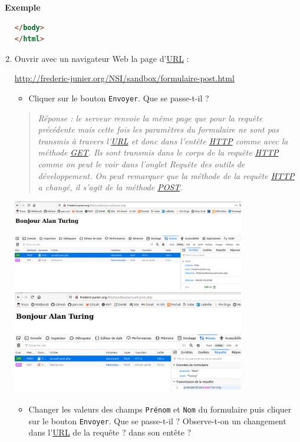 \documentclass[
  11pt,
]{article}
\newcommand{\passthrough}[1]{#1}
\providecommand{\tightlist}{%
  \setlength{\itemsep}{0pt}\setlength{\parskip}{0pt}}
\newcounter{rque}
\newcounter{exple}
\newenvironment{exemple}[1]
{\par \medskip   \addtocounter{exple}{1} \noindent  
\begin{bclogo}[arrondi =0.1,   noborder = true, logo=\bclampe, marge=4]{~\textbf{Exemple} \textbf{\theexple} {\itshape #1} }  \par}
{
\end{bclogo}
 \par \bigskip }
\begin{document}
\begin{exemple}{}
\begin{enumerate}
\begin{lstlisting}[language=HTML]
</body>
</html> 
\end{lstlisting}
\item
  Ouvrir avec un navigateur Web la page
  d'\href{https://developer.mozilla.org/fr/docs/Glossaire/URL}{URL} :

  \url{http://frederic-junier.org/NSI/sandbox/formulaire-post.html}

  \begin{itemize}
  \tightlist
  \item
    Cliquer sur le bouton \passthrough{\lstinline!Envoyer!}. Que se
    passe-t-il ?
  \end{itemize}

  \begin{quote}
  \emph{Réponse : le serveur renvoie la même page que pour la requête
  précédente mais cette fois les paramètres du formulaire ne sont pas
  transmis à travers l'\url{URL} et donc dans l'entête \url{HTTP} comme
  avec la méthode \url{GET}. Ils sont transmis dans le corps de la
  requête \url{HTTP} comme on peut le voir dans l'onglet Requête des
  outils de développement. On peut remarquer que la méthode de la
  requête \url{HTTP} a changé, il s'agit de la méthode \url{POST}}.
  \end{quote}

  \includegraphics[width=0.8\textwidth,height=\textheight]{images/requete_formulaire_post.png}\\

  \includegraphics[width=0.8\textwidth,height=\textheight]{images/requete_formulaire_post2.png}\\

  \begin{itemize}
  \tightlist
  \item
    Changer les valeurs des champs \passthrough{\lstinline!Prénom!} et
    \passthrough{\lstinline!Nom!} du formulaire puis cliquer sur le
    bouton \passthrough{\lstinline!Envoyer!}. Que se passe-t-il ?
    Observe-t-on un changement dans
    l'\href{https://developer.mozilla.org/fr/docs/Glossaire/URL}{URL} de
    la requête ? dans son entête ?
  \end{itemize}


\end{enumerate}
\end{exemple}
\end{document}
